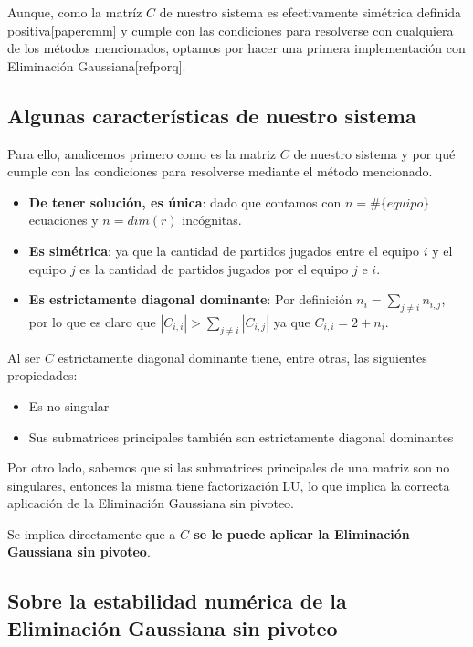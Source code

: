 Aunque, como la matríz $C$ de nuestro sistema es efectivamente simétrica definida positiva[papercmm] y cumple con las condiciones para resolverse con cualquiera de los métodos mencionados, optamos por hacer una primera implementación con Eliminación Gaussiana[refporq].

\subsection{Algunas características de nuestro sistema}

Para ello, analicemos primero como es la matriz $C$ de nuestro sistema y por qué cumple con las condiciones para resolverse mediante el método mencionado.

\begin{itemize}
    \item \textbf{De tener solución, es única}: dado que contamos con $n = \#\{equipo\}$ ecuaciones y $n = dim(r)$ incógnitas.
    \item \textbf{Es simétrica}: ya que la cantidad de partidos jugados entre el equipo $i$ y el equipo $j$ es la cantidad de partidos jugados por el equipo $j$ e $i$.
    \item \textbf{Es estrictamente diagonal dominante}: Por definición $n_i = \sum_{j \neq i} n_{i, j}$, por lo que es claro que $|C_{i, i}| > \sum_{j \neq i}|C_{i, j}|$ ya que $C_{i, i} = 2 + n_i$.
\end{itemize}

Al ser $C$ estrictamente diagonal dominante tiene, entre otras, las siguientes propiedades:

\begin{itemize}
    \item Es no singular
    \item Sus submatrices principales también son estrictamente diagonal dominantes
\end{itemize}

Por otro lado, sabemos que si las submatrices principales de una matriz son no singulares, entonces la misma tiene factorización LU, lo que implica la correcta aplicación de la Eliminación Gaussiana sin pivoteo.

Se implica directamente que a \textbf{$C$ se le puede aplicar la Eliminación Gaussiana sin pivoteo}.

\subsection{Sobre la estabilidad numérica de la Eliminación Gaussiana sin pivoteo}

